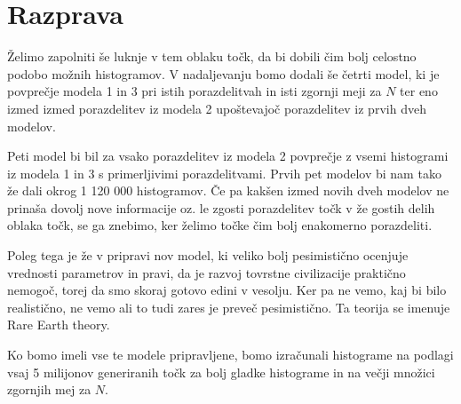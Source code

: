 \documentclass[a4paper]{IEEEtran}
\begin{document}
\section{Razprava}

Želimo zapolniti še luknje v tem oblaku točk, da bi dobili čim bolj celostno podobo možnih histogramov. V nadaljevanju bomo dodali še četrti model, ki je povprečje modela 1 in 3 pri istih porazdelitvah in isti zgornji meji za $N$ ter eno izmed izmed porazdelitev iz modela 2 upoštevajoč porazdelitev iz prvih dveh modelov.

Peti model bi bil za vsako porazdelitev iz modela 2 povprečje z vsemi histogrami iz modela 1 in 3 s primerljivimi porazdelitvami. Prvih pet modelov bi nam tako že dali okrog 1 120 000 histogramov. Če pa kakšen izmed novih dveh modelov ne prinaša dovolj nove informacije oz. le zgosti porazdelitev točk v že gostih delih oblaka točk, se ga znebimo, ker želimo točke čim bolj enakomerno porazdeliti.

Poleg tega je že v pripravi nov model, ki veliko bolj pesimistično ocenjuje vrednosti parametrov in pravi, da je razvoj tovrstne civilizacije praktično nemogoč, torej da smo skoraj gotovo edini v vesolju. Ker pa ne vemo, kaj bi bilo realistično, ne vemo ali to tudi zares je preveč pesimistično. Ta teorija se imenuje Rare Earth theory.

Ko bomo imeli vse te modele pripravljene, bomo izračunali histograme na podlagi vsaj 5 milijonov generiranih točk za bolj gladke histograme in na večji množici zgornjih mej za $N$.
\end{document}
